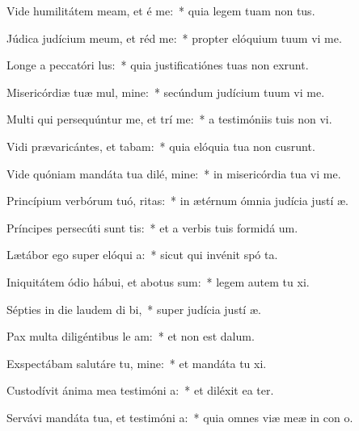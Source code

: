 \item Vide humilitátem meam, et é me:~* quia legem tuam non  tus.
\item Júdica judícium meum, et réd me:~* propter elóquium tuum vi me.
\item Longe a peccatóri lus:~* quia justificatiónes tuas non exrunt.
\item Misericórdiæ tuæ mul, mine:~* secúndum judícium tuum vi me.
\item Multi qui persequúntur me, et trí me:~* a testimóniis tuis non vi.
\item Vidi prævaricántes, et tabam:~* quia elóquia tua non cusrunt.
\item Vide quóniam mandáta tua dilé, mine:~* in misericórdia tua vi me.
\item Princípium verbórum tuó, ritas:~* in ætérnum ómnia judícia justí æ.
\item Príncipes persecúti sunt  tis:~* et a verbis tuis formidá  um.
\item Lætábor ego super elóqui a:~* sicut qui invénit spó ta.
\item Iniquitátem ódio hábui, et abotus sum:~* legem autem tu xi.
\item Sépties in die laudem di bi,~* super judícia justí æ.
\item Pax multa diligéntibus le am:~* et non est  dalum.
\item Exspectábam salutáre tu, mine:~* et mandáta tu xi.
\item Custodívit ánima mea testimóni a:~* et diléxit ea ter.
\item Servávi mandáta tua, et testimóni a:~* quia omnes viæ meæ in con o.
